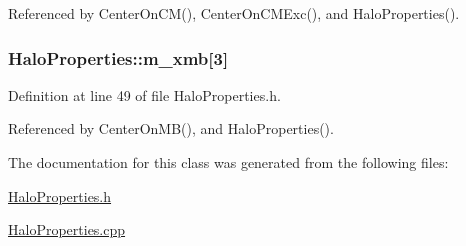 Referenced by CenterOnCM(), CenterOnCMExc(), and HaloProperties().

\subsubsection[{m\_\-xmb}]{ {\bf HaloProperties::m\_\-xmb}\mbox{[}3\mbox{]}}\label{classHaloProperties_a3936de59491d4fb5c0688b10d9652d40}


Definition at line 49 of file HaloProperties.h.



Referenced by CenterOnMB(), and HaloProperties().



The documentation for this class was generated from the following files:\begin{DoxyCompactItemize}
\item 
\hyperlink{HaloProperties_8h}{HaloProperties.h}\item 
\hyperlink{HaloProperties_8cpp}{HaloProperties.cpp}\end{DoxyCompactItemize}
